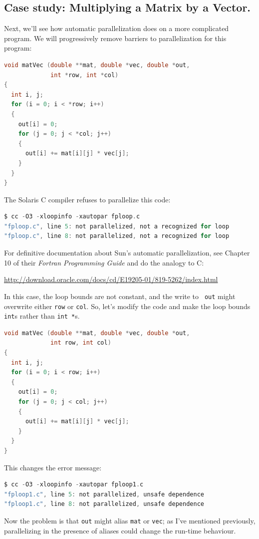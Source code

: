 \documentclass[a4paper]{report}
\begin{document}
\subsection*{Case study: Multiplying a Matrix by a Vector.}
Next, we'll see how automatic parallelization does on a more complicated
program. We will progressively remove barriers to parallelization for
this program:
\begin{lstlisting}[language=C]
void matVec (double **mat, double *vec, double *out,
             int *row, int *col) 
{
  int i, j;
  for (i = 0; i < *row; i++)
  {
    out[i] = 0;
    for (j = 0; j < *col; j++)
    {
      out[i] += mat[i][j] * vec[j];
    }
  }
}
\end{lstlisting}

The Solaris C compiler refuses to parallelize this code:
{\small 
\begin{lstlisting}[language=C]
$ cc -O3 -xloopinfo -xautopar fploop.c 
"fploop.c", line 5: not parallelized, not a recognized for loop
"fploop.c", line 8: not parallelized, not a recognized for loop
\end{lstlisting} 
}
For definitive documentation about Sun's automatic parallelization, see
Chapter 10 of their \emph{Fortran Programming Guide} and do the analogy to C:

\url{http://download.oracle.com/docs/cd/E19205-01/819-5262/index.html}

In this case, the loop bounds are not constant, and the write to {\tt
  out} might overwrite either {\tt row} or {\tt col}. So, let's modify
the code and make the loop bounds {\tt int}s rather than {\tt int *}s.
\begin{lstlisting}[language=C]
void matVec (double **mat, double *vec, double *out,
             int row, int col) 
{
  int i, j;
  for (i = 0; i < row; i++)
  {
    out[i] = 0;
    for (j = 0; j < col; j++)
    {
      out[i] += mat[i][j] * vec[j];
    }
  }
}
\end{lstlisting}
 This changes the error message:
\begin{lstlisting}[language=C]
$ cc -O3 -xloopinfo -xautopar fploop1.c 
"fploop1.c", line 5: not parallelized, unsafe dependence
"fploop1.c", line 8: not parallelized, unsafe dependence
\end{lstlisting} 

Now the problem is that {\tt out} might alias {\tt mat} or {\tt vec};
as I've mentioned previously, parallelizing
in the presence of aliases could change the run-time behaviour.
\end{document}
